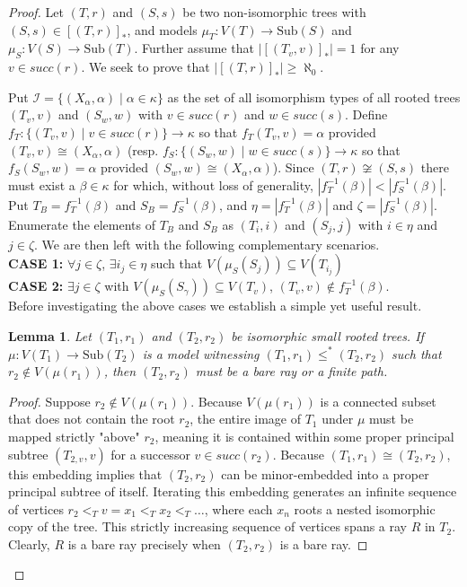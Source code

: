 \documentclass[12pt]{amsart}
\newtheorem{lemma}{Lemma}[section]
\numberwithin{mytheorem}{section} %
\numberwithin{mylemma}{section} %
\numberwithin{mycorollary}{section} %
\begin{document}
\begin{proof} Let $(T,r)$ and $(S,s)$ be two non-isomorphic trees with $(S,s)\in [(T,r)]_*$, and models $\mu_T: V(T) \to \text{Sub}(S)$ and $\mu_S: V(S) \to \text{Sub}(T)$. Further assume that $|[(T_v, v)]_*| =1$ for any $v \in succ(r)$. We seek to prove that $|[(T,r)]_*| \geq \aleph_0$. 

Put $\mathcal{I}= \{(X_\alpha,\alpha) \mid \alpha\in \kappa\}$  as the set of all isomorphism types of all rooted trees $(T_v,v)$ and $(S_w,w)$ with $v\in succ(r)$  and $w\in succ(s)$. Define $f_T: \{(T_v,v)\mid v\in succ(r)\} \to \kappa$ so that $f_T(T_v,v) = \alpha$ provided $(T_v,v) \cong (X_\alpha, \alpha)$ (resp. $f_S: \{(S_w,w)\mid w \in succ(s)\} \to \kappa$ so that $f_S(S_w, w) = \alpha$ provided $(S_w, w) \cong (X_\alpha, \alpha)$). Since $(T,r) \not \cong (S,s)$ there must exist a $\beta \in \kappa$ for which, without loss of generality, $ |f_T^{-1}(\beta)| < |f_S^{-1}(\beta)|$. Put $T_B = f_T^{-1}(\beta)$ and $S_B = f_S^{-1}(\beta)$, and $\eta = |f_T^{-1}(\beta)|$ and $\zeta = |f_S^{-1}(\beta)|$. Enumerate the elements of $T_B$ and $S_B$ as $(T_i,i)$ and $(S_j,j)$ with $i\in \eta$ and $j\in \zeta$. We are then left with the following complementary scenarios.\\



\noindent
{\bf CASE 1:} $\forall j \in \zeta$, $\exists i_j \in \eta$ such that $V(\mu_S(S_j)) \subseteq V(T_{i_j})$\\ 

\noindent
{\bf CASE 2:} $\exists j \in \zeta$ with $V(\mu_S(S_\gamma)) \subseteq V(T_v)$, $(T_v, v) \not \in f_T^{-1}(\beta)$. \\

Before investigating the above cases we establish a simple yet useful result.

\begin{lemma}\label{lem:root_anchor} Let $(T_1, r_1)$ and $(T_2, r_2)$ be isomorphic small rooted trees. If $\mu: V(T_1) \to \text{Sub}(T_2)$ is a model witnessing $(T_1, r_1) \leq^* (T_2, r_2)$ such that $r_2 \notin V(\mu(r_1))$, then $(T_2, r_2)$ must be a bare ray or a finite path.\end{lemma}\begin{proof}Suppose $r_2 \notin V(\mu(r_1))$. Because $V(\mu(r_1))$ is a connected subset that does not contain the root $r_2$, the entire image of $T_1$ under $\mu$ must be mapped strictly "above" $r_2$, meaning it is contained within some proper principal subtree $(T_{2,v}, v)$ for a successor $v \in succ(r_2)$. Because $(T_1, r_1) \cong (T_2, r_2)$, this embedding implies that $(T_2, r_2)$ can be minor-embedded into a proper principal subtree of itself. Iterating this embedding generates an infinite sequence of vertices $r_2 <_T v = x_1 <_T x_2 <_T \ldots$, where each $x_n$ roots a nested isomorphic copy of the tree. This strictly increasing sequence of vertices spans a ray $R$ in $T_2$. Clearly, $R$ is a bare ray precisely when $(T_2, r_2)$ is a bare ray.\end{proof}


\end{proof}
\end{document}

